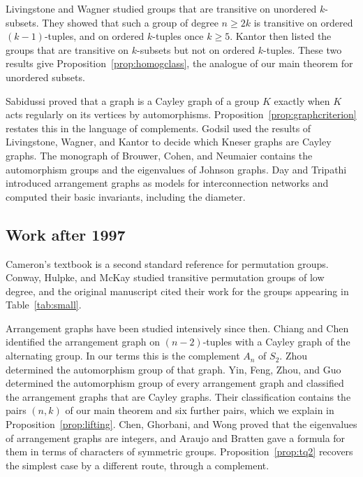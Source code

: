 \documentclass[12pt,letterpaper]{article}
\numberwithin{equation}{section}
\theoremstyle{definition}
\begin{document}
Livingstone and Wagner \cite{LW65} studied groups that are transitive on unordered $k$-subsets. They showed that such a group of degree $n\geq 2k$ is transitive on ordered $(k-1)$-tuples, and on ordered $k$-tuples once $k\geq5$. Kantor \cite{Ka72} then listed the groups that are transitive on $k$-subsets but not on ordered $k$-tuples. These two results give Proposition~\ref{prop:homogclass}, the analogue of our main theorem for unordered subsets.

Sabidussi \cite{Sa58} proved that a graph is a Cayley graph of a group $K$ exactly when $K$ acts regularly on its vertices by automorphisms. Proposition~\ref{prop:graphcriterion} restates this in the language of complements. Godsil \cite{Go80} used the results of Livingstone, Wagner, and Kantor to decide which Kneser graphs are Cayley graphs. The monograph of Brouwer, Cohen, and Neumaier \cite{BCN89} contains the automorphism groups and the eigenvalues of Johnson graphs. Day and Tripathi \cite{DT92} introduced arrangement graphs as models for interconnection networks and computed their basic invariants, including the diameter.

\subsection*{Work after 1997}
Cameron's textbook \cite{Ca99} is a second standard reference for permutation groups. Conway, Hulpke, and McKay \cite{CHM98} studied transitive permutation groups of low degree, and the original manuscript cited their work for the groups appearing in Table~\ref{tab:small}.

Arrangement graphs have been studied intensively since then. Chiang and Chen \cite{CC98} identified the arrangement graph on $(n-2)$-tuples with a Cayley graph of the alternating group. In our terms this is the complement $A_n$ of $S_2$. Zhou \cite{Zh11} determined the automorphism group of that graph. Yin, Feng, Zhou, and Guo \cite{YFZG21} determined the automorphism group of every arrangement graph and classified the arrangement graphs that are Cayley graphs. Their classification contains the pairs $(n,k)$ of our main theorem and six further pairs, which we explain in Proposition~\ref{prop:lifting}. Chen, Ghorbani, and Wong \cite{CGW14} proved that the eigenvalues of arrangement graphs are integers, and Araujo and Bratten \cite{AB16} gave a formula for them in terms of characters of symmetric groups. Proposition~\ref{prop:tq2} recovers the simplest case by a different route, through a complement.
\end{document}
